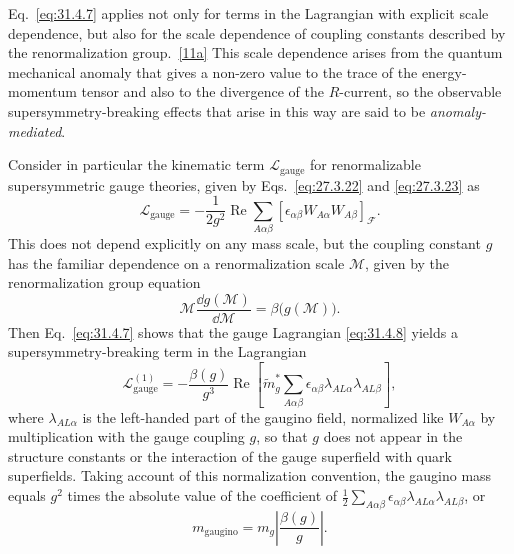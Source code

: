 Eq.~\eqref{eq:31.4.7} applies not only for terms in the Lagrangian with
explicit scale dependence, but also for the scale dependence of coupling
constants described by the renormalization
group.~\hyperref[ch31-ref-11a]{[11a]} This scale dependence arises from the
quantum mechanical anomaly that gives a non-zero value to the trace of the
energy-momentum tensor and also to the divergence of the \(R\)-current, so
the observable supersymmetry-breaking effects that arise in this way are
said to be \emph{anomaly-mediated}.

Consider in particular the kinematic term \(\mathcal L_{\mathrm{gauge}}\)
for renormalizable supersymmetric gauge theories, given by
Eqs.~\eqref{eq:27.3.22} and \eqref{eq:27.3.23} as
\begin{equation}
  \mathcal L_{\mathrm{gauge}}
  =-\frac1{2g^2}\operatorname{Re}
  \sum_{A\alpha\beta}
  [\epsilon_{\alpha\beta}W_{A\alpha}W_{A\beta}]_{\mathcal F}.
  \tag{31.4.8}\label{eq:31.4.8}
\end{equation}
This does not depend explicitly on any mass scale, but the coupling
constant \(g\) has the familiar dependence on a renormalization scale
\(\mathcal M\), given by the renormalization group equation
\begin{equation}
  \mathcal M\frac{\dd g(\mathcal M)}{\dd\mathcal M}
  =\beta\bigl(g(\mathcal M)\bigr).
  \tag{31.4.9}\label{eq:31.4.9}
\end{equation}
Then Eq.~\eqref{eq:31.4.7} shows that the gauge Lagrangian
\eqref{eq:31.4.8} yields a supersymmetry-breaking term in the Lagrangian
\begin{equation}
  \mathcal L_{\mathrm{gauge}}^{(1)}
  =-\frac{\beta(g)}{g^3}\operatorname{Re}
  \left[
    \widetilde m_g^*
    \sum_{A\alpha\beta}
    \epsilon_{\alpha\beta}\lambda_{AL\alpha}\lambda_{AL\beta}
  \right],
  \tag{31.4.10}\label{eq:31.4.10}
\end{equation}
where \(\lambda_{AL\alpha}\) is the left-handed part of the gaugino field,
normalized like \(W_{A\alpha}\) by multiplication with the gauge coupling
\(g\), so that \(g\) does not appear in the structure constants or the
interaction of the gauge superfield with quark superfields. Taking account
of this normalization convention, the gaugino mass equals \(g^2\) times
the absolute value of the coefficient of
\(\frac12\sum_{A\alpha\beta}
\epsilon_{\alpha\beta}\lambda_{AL\alpha}\lambda_{AL\beta}\), or
\begin{equation}
  m_{\mathrm{gaugino}}
  =m_g\left|\frac{\beta(g)}{g}\right|.
  \tag{31.4.11}\label{eq:31.4.11}
\end{equation}
